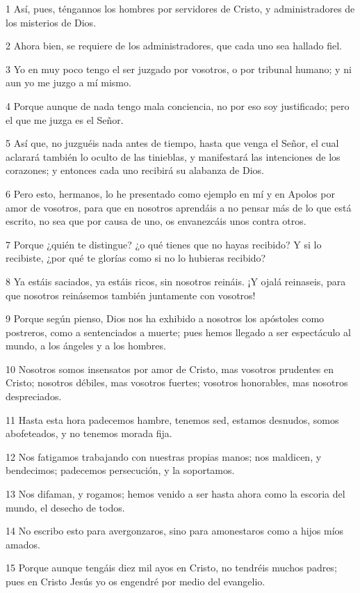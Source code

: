 \par 1 Así, pues, téngannos los hombres por servidores de Cristo, y administradores de los misterios de Dios.
\par 2 Ahora bien, se requiere de los administradores, que cada uno sea hallado fiel.
\par 3 Yo en muy poco tengo el ser juzgado por vosotros, o por tribunal humano; y ni aun yo me juzgo a mí mismo.
\par 4 Porque aunque de nada tengo mala conciencia, no por eso soy justificado; pero el que me juzga es el Señor.
\par 5 Así que, no juzguéis nada antes de tiempo, hasta que venga el Señor, el cual aclarará también lo oculto de las tinieblas, y manifestará las intenciones de los corazones; y entonces cada uno recibirá su alabanza de Dios.
\par 6 Pero esto, hermanos, lo he presentado como ejemplo en mí y en Apolos por amor de vosotros, para que en nosotros aprendáis a no pensar más de lo que está escrito, no sea que por causa de uno, os envanezcáis unos contra otros.
\par 7 Porque ¿quién te distingue? ¿o qué tienes que no hayas recibido? Y si lo recibiste, ¿por qué te glorías como si no lo hubieras recibido?
\par 8 Ya estáis saciados, ya estáis ricos, sin nosotros reináis. ¡Y ojalá reinaseis, para que nosotros reinásemos también juntamente con vosotros!
\par 9 Porque según pienso, Dios nos ha exhibido a nosotros los apóstoles como postreros, como a sentenciados a muerte; pues hemos llegado a ser espectáculo al mundo, a los ángeles y a los hombres.
\par 10 Nosotros somos insensatos por amor de Cristo, mas vosotros prudentes en Cristo; nosotros débiles, mas vosotros fuertes; vosotros honorables, mas nosotros despreciados.
\par 11 Hasta esta hora padecemos hambre, tenemos sed, estamos desnudos, somos abofeteados, y no tenemos morada fija.
\par 12 Nos fatigamos trabajando con nuestras propias manos; nos maldicen, y bendecimos; padecemos persecución, y la soportamos.
\par 13 Nos difaman, y rogamos; hemos venido a ser hasta ahora como la escoria del mundo, el desecho de todos.
\par 14 No escribo esto para avergonzaros, sino para amonestaros como a hijos míos amados.
\par 15 Porque aunque tengáis diez mil ayos en Cristo, no tendréis muchos padres; pues en Cristo Jesús yo os engendré por medio del evangelio.
